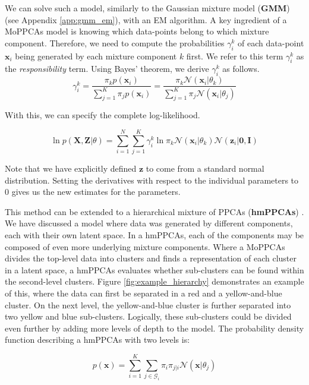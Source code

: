 We can solve such a model, similarly to the Gaussian mixture model (\textbf{GMM}) (see Appendix \ref{app:gmm_em}), with an EM algorithm. A key ingredient of a MoPPCAs model is knowing which data-points belong to which mixture component. Therefore, we need to compute the probabilities $\gamma^k_i$ of each data-point $\bm{x}_i$ being generated by each mixture component $k$ first. We refer to this term $\gamma^k_i$ as the \textit{responsibility} term. Using Bayes' theorem, we derive $\gamma^k_i$ as follows.
\begin{equation}\label{eq:gamma}
    \gamma^k_i = \frac{\pi_k p(\bm{x}_i)}{\sum^K_{j=1} \pi_j p(\bm{x}_i)} = \frac{\pi_k \mathcal{N}(\bm{x}_i|\theta_k)}{\sum^K_{j=1} \pi_j \mathcal{N}(\bm{x}_i|\theta_j)}
\end{equation}

With this, we can specify the complete log-likelihood.

\begin{equation}\label{eq:loglike_moppcas}
\ln{p(\bm{X}, \bm{Z} | \theta)} = \sum^N_{i=1} \sum^K_{j=1} \gamma^k_i \ln{\pi_k \mathcal{N}(\bm{x}_i|\theta_k) \mathcal{N}(\bm{z}_i|\bm{0},\bm{I})}
\end{equation}

Note that we have explicitly defined $\bm{z}$ to come from a standard normal distribution. Setting the derivatives with respect to the individual parameters to $0$ gives us the new estimates for the parameters.

This method can be extended to a hierarchical mixture of PPCAs (\textbf{hmPPCAs}) \cite{bishop1998hierarchical}. We have discussed a model where data was generated by different components, each with their own latent space. In a hmPPCAs, each of the components may be composed of even more underlying mixture components. Where a MoPPCAs divides the top-level data into clusters and finds a representation of each cluster in a latent space, a hmPPCAs evaluates whether sub-clusters can be found within the second-level clusters. Figure \ref{fig:example_hierarchy} demonstrates an example of this, where the data can first be separated in a red and a yellow-and-blue cluster. On the next level, the yellow-and-blue cluster is further separated into two yellow and blue sub-clusters. Logically, these sub-clusters could be divided even further by adding more levels of depth to the model. The probability density function describing a hmPPCAs with two levels is:

\begin{equation}\label{eq:hmppca}
    p(\bm{x}) = \sum^K_{i=1} \sum_{j\in \mathcal{G}_i} \pi_i \pi_{j|i} \mathcal{N}(\bm{x}|\theta_j)
\end{equation}

